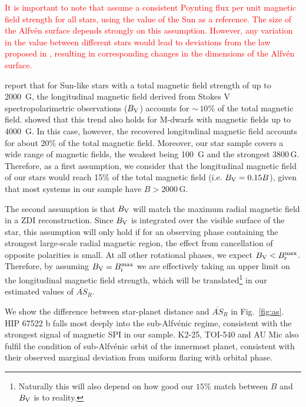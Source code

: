 \documentclass[twocolumn]{aastex631}
\begin{document}
\textcolor{red}{It is important to note that \citet{chebly2023numerical} assume a consistent Poynting flux per unit magnetic field strength for all stars, using the value of the Sun as a reference. The size of the Alfv\'en surface depends strongly on this assumption. However, any variation in the value between different stars would lead to deviations from the law proposed in \citet{chebly2023numerical}, resulting in corresponding changes in the dimensions of the Alfvén surface.}


\citet{reiners2022magnetism} report that for Sun-like stars with a total magnetic field strength of up to 2000~G, the longitudinal magnetic field derived from Stokes V spectropolarimetric observations ($B_{\rm V}$) accounts for $\sim$\,$10$\% of the total magnetic field. \cite{kochukhov2020hidden} showed that this trend also holds for M-dwarfs with magnetic fields up to 4000~G. In this case, however, the recovered longitudinal magnetic field accounts for about $20\%$ of the total magnetic field. Moreover, our star sample covers a wide range of magnetic fields, the weakest being 100~G and the strongest $3800\,$G. Therefore, as a first assumption, we consider that the longitudinal magnetic field of our stars would reach 15\% of the total magnetic field (i.e. $B_{\rm V} = 0.15B$), given that most systems in our sample have $B>2000\,$G. 

The second assumption is that $B_{\rm V}$ will match the maximum radial magnetic field in a ZDI reconstruction. Since $B_{\rm V}$ is integrated over the visible surface of the star, this assumption will only hold if for an observing phase containing the strongest large-scale radial magnetic region, the effect from cancellation of opposite polarities is small. At all other rotational phases, we expect $B_{\rm V} < B_{\rm r}^{\rm max}$. Therefore, by assuming $B_{\rm V} = B_{\rm r}^{\rm max}$ we are effectively taking an upper limit on the longitudinal magnetic field strength, which will be translated\footnote[3]{Naturally this will also depend on how good our $15$\% match between $B$ and $B_{\rm V}$ is to reality.} in our estimated values of $\overline{AS}_{R}$.

We show the difference between star-planet distance and $\overline{AS}_{R}$ in Fig.~\ref{fig:as}. HIP 67522 b falls most deeply into the sub-Alfv\'enic regime, consistent with the strongest signal of magnetic SPI in our sample. K2-25, TOI-540 and AU Mic also fulfil the condition of sub-Alfv\'enic orbit of the innermost planet, consistent with their observed marginal deviation from uniform flaring with orbital phase. 
\end{document}
